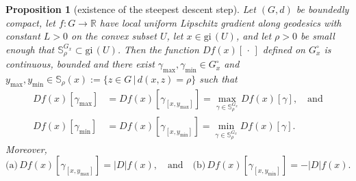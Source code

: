 \documentclass{article}
\theoremstyle{plain}\newtheorem{theorem}{Theorem}[section]
\theoremstyle{plain}\newtheorem{definition}[theorem]{Definition}
\theoremstyle{plain}\newtheorem{lemma}[theorem]{Lemma}
\theoremstyle{definition}\newtheorem{remark}[theorem]{Remark}
\theoremstyle{definition}\newtheorem{example}[theorem]{Example}
\theoremstyle{plain}\newtheorem{proposition}[theorem]{Proposition}
\theoremstyle{plain}\newtheorem{inference}[theorem]{Inference}
\theoremstyle{plain}\newtheorem{corollary}[theorem]{Corollary}
\theoremstyle{plain}\newtheorem{assumption}[theorem]{Assumption}
\begin{document}
\begin{proposition}[existence of the steepest descent step]\label{pr: ex of SD direction}
    Let $(G,d)$ be boundedly compact,  let $f:G\to\mathbb{R}$ have local uniform Lipschitz gradient along geodesics with constant $L>0$ on the convex subset $U$, let $x\in \mathrm{gi}\,(U)$, and let $\rho>0$ be small enough that $\mathbb{S}^{G_x}_{\rho}\subset \mathrm{gi}\,(U)$. Then the function $Df(x)[\,\cdot\,]$ defined on $G_x^{\circ}$ is continuous, bounded and there exist $\gamma_{\max},\gamma_{\min}\in G_x^{\circ}$ and $y_{\max}, y_{\min}\in\mathbb{S}_{\rho}(x):=\bigl\{ z\in G \,\big|\, d(x,z)=\rho \bigr\}$ such that
    \begin{equation}\label{eq:sa-sd}
    \begin{aligned}
        Df(x)[\gamma_{\max}] &= Df(x)[\gamma_{[x,y_{\max}]}] = \max_{\gamma\in \mathbb{S}^{G_x}_{\rho}}Df(x)[\gamma],\quad\mbox{and}\\
        Df(x)[\gamma_{\min}]&= Df(x)[\gamma_{[x,y_{\min}]}] = \min_{\gamma\in \mathbb{S}^{G_x}_{\rho}}Df(x)[\gamma].
        \end{aligned}
    \end{equation}
    Moreover,
    \begin{equation}\label{eq: steepest descent}
    \mbox{(a)}\, Df(x)[\gamma_{[x,y_{\max}]}]=|D|f(x), \quad\mbox{and}\quad \mbox{(b)}\, Df(x)[\gamma_{[x,y_{\min}]}]=-|D|f(x).
    \end{equation}
\end{proposition}
\end{document}
